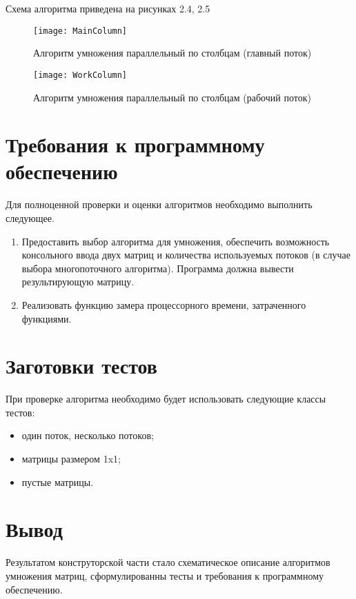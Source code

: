 Схема алгоритма приведена на рисунках 2.4, 2.5
\begin{figure}[h]
	\begin{center}
		{\texttt{[image: MainColumn]}}
		\caption{Алгоритм умножения параллельный по столбцам (главный поток)}
	\end{center}
\end{figure}
\begin{figure}[h]
	\begin{center}
		{\texttt{[image: WorkColumn]}}
		\caption{Алгоритм умножения параллельный по столбцам (рабочий поток)}
	\end{center}
\end{figure}

\section{Требования к программному обеспечению}
Для полноценной проверки и оценки алгоритмов необходимо выполнить следующее.
\begin{enumerate}
	\item Предоставить выбор алгоритма для умножения, обеспечить возможность консольного ввода двух матриц и количества используемых потоков (в случае выбора многопоточного алгоритма). Программа должна вывести результирующую матрицу.
	\item Реализовать функцию замера процессорного времени, затраченного функциями.
\end{enumerate}


\section{Заготовки тестов}
При проверке алгоритма необходимо будет использовать следующие классы тестов:
\begin{itemize}
	\item один поток, несколько потоков;
	\item матрицы размером 1x1;
	\item пустые матрицы.
\end{itemize}

\section*{Вывод}
Результатом конструторской части стало схематическое описание алгоритмов умножения матриц, сформулированны тесты и требования к программному обеспечению.



